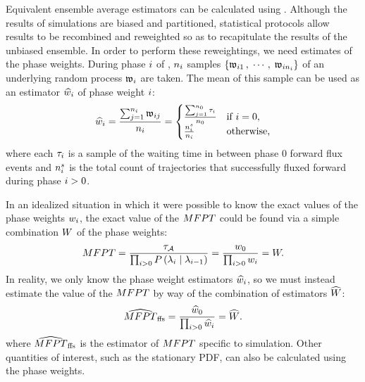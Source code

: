 
Equivalent ensemble average estimators can be calculated using . Although the results of  simulations are biased and partitioned, statistical protocols allow  results to be recombined and reweighted so as to recapitulate the results of the unbiased ensemble. In order to perform these reweightings, we need estimates of the phase weights. During phase $i$ of , $n_{i}$ samples $\left\{ \mathfrak{w}_{i 1} \,, \; \cdots \,, \; \mathfrak{w}_{i n_{i}} \right\}$ of an underlying random process $\mathfrak{w}_{i}$ are taken. The mean of this sample can be used as an estimator $\widehat{w}_{i}$ of phase weight $i$:
    \begin{equation}
    \label{eq:pwest_definition}
        \widehat{w}_{i} = \frac{\sum_{j=1}^{n_{i}} \mathfrak{w}_{i j}} {n_{i}} =
        \begin{cases}
            \frac{\sum_{j=1}^{n_{0}} \tau_{i}}{n_{0}}    & \text{if}\ i=0, \\
            \frac{n_{i}^{s}}{n_{i}}    & \text{otherwise,}
        \end{cases}
    \end{equation}
where each $\tau_{i}$ is a sample of the waiting time in between phase 0 forward flux events and $n_{i}^{s}$ is the total count of trajectories that successfully fluxed forward during phase $i>0$.

In an idealized situation in which it were possible to know the exact values of the phase weights $w_{i}$, the exact value of the $MFPT$ could be found via a simple combination $W$ of the phase weights:
    \begin{equation}
    \label{eq:PWtrue_definition}
        MFPT = \frac{\tau_{\mathcal{A}}}{\prod_{i>0} P\left(  {\lambda}_{i} \mid {\lambda}_{i - 1}  \right)} = \frac{w_{0}}{\prod_{i>0} w_{i}} = W.
    \end{equation}
In reality, we only know the phase weight estimators $\widehat{w}_{i}$, so we must instead estimate the value of the $MFPT$ by way of the combination of estimators $\widehat{W}$:
    \begin{equation}
    \label{eq:PWest_definition}
        \widehat{MFPT}_{\text{ffs}} = \frac{\widehat{w}_{0}}{\prod_{i>0} \widehat{w}_{i}} = \widehat{W}.
    \end{equation}
where $\widehat{MFPT}_{\text{ffs}}$ is the estimator of $MFPT$ specific to  simulation. Other quantities of interest, such as the stationary PDF, can also be calculated using the phase weights\supercite{Valeriani:2007hv}.

